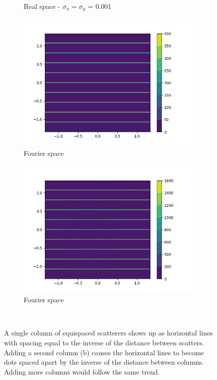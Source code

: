 \documentclass{article}
\begin{document}
\begin{figure}[h]
\begin{subfigure}{0.45\textwidth}
                \caption{Real space - $\sigma_x=\sigma_y$ = 0.001}\label{fig:real_2d_2column}
        \end{subfigure}
	\begin{subfigure}{0.45\textwidth}
                \centering
                \includegraphics[width=\textwidth]{fourier_2d_1column.png}
                \caption{Fourier space}\label{fig:fourier_2d_1column}
	\end{subfigure}
        \begin{subfigure}{0.45\textwidth}
                \centering
                \includegraphics[width=\textwidth]{fourier_2d_2column.png}
                \caption{Fourier space}\label{fourier_2d_2column}
        \end{subfigure}
	\caption{A single column of equispaced scatterers shows up as horizontal lines
		 with spacing equal to the inverse of the distance between scatters. Adding
		 a second column (b) causes the horizontal lines to become dots spaced apart
		 by the inverse of the distance between columns. Adding more columns would
                 follow the same trend.}~\label{fig:2d_columns_simple}
\end{figure}
\end{document}

